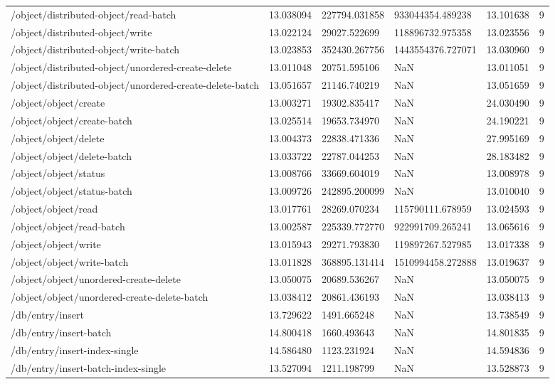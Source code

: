 \begin{tabularx}{\linewidth}{XXXXXX}
/object/distributed-object/read-batch & 13.038094 & 227794.031858 & 933044354.489238 & 13.101638 & 9 \\
/object/distributed-object/write & 13.022124 & 29027.522699 & 118896732.975358 & 13.023556 & 9 \\
/object/distributed-object/write-batch & 13.023853 & 352430.267756 & 1443554376.727071 & 13.030960 & 9 \\
/object/distributed-object/unordered-create-delete & 13.011048 & 20751.595106 & NaN & 13.011051 & 9 \\
/object/distributed-object/unordered-create-delete-batch & 13.051657 & 21146.740219 & NaN & 13.051659 & 9 \\
/object/object/create & 13.003271 & 19302.835417 & NaN & 24.030490 & 9 \\
/object/object/create-batch & 13.025514 & 19653.734970 & NaN & 24.190221 & 9 \\
/object/object/delete & 13.004373 & 22838.471336 & NaN & 27.995169 & 9 \\
/object/object/delete-batch & 13.033722 & 22787.044253 & NaN & 28.183482 & 9 \\
/object/object/status & 13.008766 & 33669.604019 & NaN & 13.008978 & 9 \\
/object/object/status-batch & 13.009726 & 242895.200099 & NaN & 13.010040 & 9 \\
/object/object/read & 13.017761 & 28269.070234 & 115790111.678959 & 13.024593 & 9 \\
/object/object/read-batch & 13.002587 & 225339.772770 & 922991709.265241 & 13.065616 & 9 \\
/object/object/write & 13.015943 & 29271.793830 & 119897267.527985 & 13.017338 & 9 \\
/object/object/write-batch & 13.011828 & 368895.131414 & 1510994458.272888 & 13.019637 & 9 \\
/object/object/unordered-create-delete & 13.050075 & 20689.536267 & NaN & 13.050075 & 9 \\
/object/object/unordered-create-delete-batch & 13.038412 & 20861.436193 & NaN & 13.038413 & 9 \\
/db/entry/insert & 13.729622 & 1491.665248 & NaN & 13.738549 & 9 \\
/db/entry/insert-batch & 14.800418 & 1660.493643 & NaN & 14.801835 & 9 \\
/db/entry/insert-index-single & 14.586480 & 1123.231924 & NaN & 14.594836 & 9 \\
/db/entry/insert-batch-index-single & 13.527094 & 1211.198799 & NaN & 13.528873 & 9 \\

\end{tabularx}
